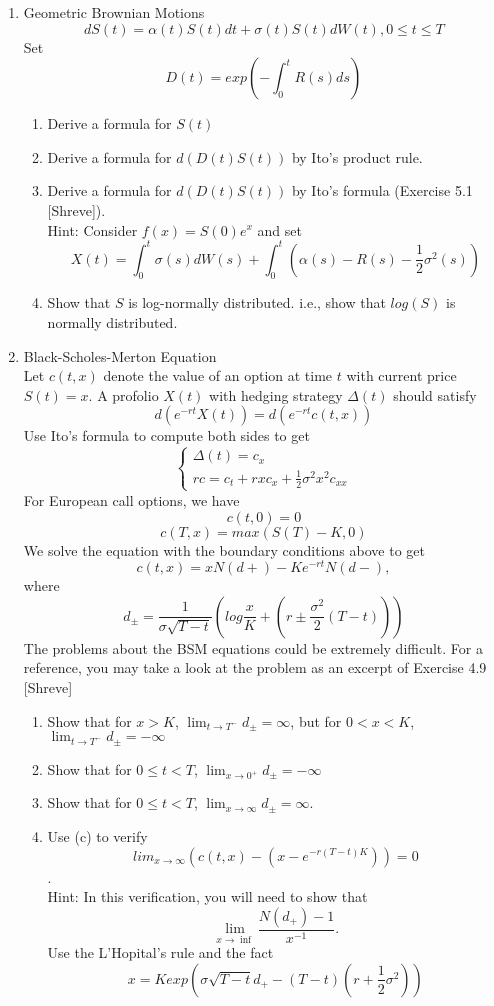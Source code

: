 \documentclass[12pt]{article}
\begin{document}
\begin{enumerate}
\begin{enumerate}
\end{enumerate}
\newpage
\item Geometric Brownian Motions
\[dS(t) = \alpha(t)S(t)dt+\sigma(t)S(t)dW(t), 0\leq t\leq T\]
Set 
\[ D(t) = exp\left(-\int_0^t R(s)ds\right)\]
\begin{enumerate}
\item Derive a formula for $S(t)$
\item Derive a formula for $d(D(t)S(t))$ by Ito's product rule.
\item Derive a formula for $d(D(t)S(t))$ by Ito's formula (Exercise 5.1 [Shreve]). 
\\
Hint: Consider $f(x) = S(0)e^x$ and set 
\[
X(t) = \int_0^t \sigma(s)dW(s) + \int_0^t \left(\alpha(s)-R(s)-\frac12\sigma^2(s) \right)
\]
\item Show that $S$ is log-normally distributed. i.e., show that $log(S)$ is normally distributed.
\end{enumerate}
\newpage
\item Black-Scholes-Merton Equation
\\
Let $c(t,x)$ denote the value of an option at time $t$ with current price $S(t)=x$. A profolio $X(t)$ with hedging strategy $\Delta(t)$ should satisfy
\[
d(e^{-rt}X(t)) = d(e^{-rt}c(t,x))
\]
Use Ito's formula to compute both sides to get
\[
\left\{
\begin{array}{l}
\Delta(t) = c_x \\
rc = c_t +rxc_x + \frac12 \sigma^2 x^2 c_{xx}
\end{array}
\right.
\]
For European call options, we have
\[
c(t,0) = 0
\]
\[
c(T,x) = max(S(T)-K, 0)
\]
We solve the equation with the boundary conditions above to get 
\[
c(t,x)=xN(d+)-Ke^{-rt}N(d-),
\]
where
\[
d_{\pm} = \frac1{\sigma\sqrt{T-t}} \left(log \frac xK + \left(r\pm \frac {\sigma^2}{2}(T-t) \right) \right)
\]
The problems about the BSM equations could be extremely difficult. For a reference, you may take a look at the problem as an excerpt of Exercise 4.9 [Shreve]
\begin{enumerate}
\item Show that for $x>K$, $\lim_{t\to T^-}d_{\pm}=\infty$, but for $0< x< K$,  $\lim_{t\to T^-}d_{\pm}=-\infty$
\item Show that for $0\leq t<T$,  $\lim_{x\to 0^+}d_{\pm}=-\infty$
\item Show that for $0\leq t<T$,  $\lim_{x\to \infty}d_{\pm}=\infty$.
\item Use (c) to verify \[ lim_{x\to\infty} \left(c(t,x)-(x-e^{-r(T-t)K})\right)=0 \]. 
\\
Hint: In this verification, you will need to show that 
\[
\lim_{x\to\inf} \frac{N(d_+)-1}{x^{-1}}.
\]
Use the L'Hopital's rule and the fact
\[
x=K exp\left(\sigma\sqrt{T-t}d_+ - (T-t)\left(r+\frac12\sigma^2\right) \right)
\]
\end{enumerate}
\end{enumerate}
\end{document}
